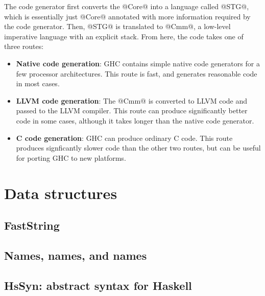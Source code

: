 \documentclass{article}
\begin{document}
The code generator first converts the @Core@ into a language called
@STG@, which is essentially just @Core@ annotated with more
information required by the code generator.  Then, @STG@ is translated
to @Cmm@, a low-level imperative language with an explicit stack. From
here, the code takes one of three routes:

\begin{itemize}
\item \textbf{Native code generation}: GHC contains simple native code
  generators for a few processor architectures.  This route is fast,
  and generates reasonable code in most cases.

\item \textbf{LLVM code generation}: The @Cmm@ is converted to LLVM
  code and passed to the LLVM compiler.  This route can produce
  significantly better code in some cases, although it takes longer
  than the native code generator.

\item \textbf{C code generation}: GHC can produce ordinary C code.
  This route produces signficantly slower code than the other two
  routes, but can be useful for porting GHC to new platforms.
\end{itemize}

\section{Data structures}
\label{s:data}

\subsection{FastString}


\subsection{Names, names, and names}
\label{s:names}


\subsection{HsSyn: abstract syntax for Haskell}

\end{document}
